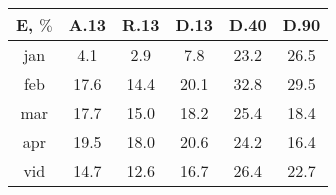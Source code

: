 \begin{tabular}{ | c | c c c c c | }\hline
E, $\%$	&A.13	&R.13	&D.13	&D.40	&D.90\\ \hline
jan		&4.1	&2.9	&7.8	&23.2	&26.5\\
feb		&17.6	&14.4	&20.1	&32.8	&29.5\\
mar		&17.7	&15.0	&18.2	&25.4	&18.4\\
apr		&19.5	&18.0	&20.6	&24.2	&16.4\\ \hline
vid		&14.7	&12.6	&16.7	&26.4	&22.7\\ \hline
\end{tabular}